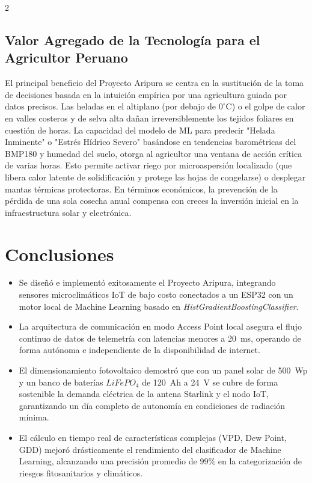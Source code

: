 \documentclass[a4paper, 11pt]{article}
\begin{document}
\begin{multicols}{2}
\subsection{Valor Agregado de la Tecnología para el Agricultor Peruano}
El principal beneficio del Proyecto Aripura se centra en la sustitución de la toma de decisiones basada en la intuición empírica por una agricultura guiada por datos precisos. Las heladas en el altiplano (por debajo de $0^\circ\text{C}$) o el golpe de calor en valles costeros y de selva alta dañan irreversiblemente los tejidos foliares en cuestión de horas. La capacidad del modelo de ML para predecir "Helada Inminente" o "Estrés Hídrico Severo" basándose en tendencias barométricas del BMP180 y humedad del suelo, otorga al agricultor una ventana de acción crítica de varias horas. Esto permite activar riego por microaspersión localizado (que libera calor latente de solidificación y protege las hojas de congelarse) o desplegar mantas térmicas protectoras. En términos económicos, la prevención de la pérdida de una sola cosecha anual compensa con creces la inversión inicial en la infraestructura solar y electrónica.

\section{Conclusiones}

\begin{itemize}
    \item Se diseñó e implementó exitosamente el Proyecto Aripura, integrando sensores microclimáticos IoT de bajo costo conectados a un ESP32 con un motor local de Machine Learning basado en \textit{HistGradientBoostingClassifier}.
    \item La arquitectura de comunicación en modo Access Point local asegura el flujo continuo de datos de telemetría con latencias menores a \SI{20}{ms}, operando de forma autónoma e independiente de la disponibilidad de internet.
    \item El dimensionamiento fotovoltaico demostró que con un panel solar de \SI{500}{Wp} y un banco de baterías $LiFePO_4$ de \SI{120}{Ah} a \SI{24}{V} se cubre de forma sostenible la demanda eléctrica de la antena Starlink y el nodo IoT, garantizando un día completo de autonomía en condiciones de radiación mínima.
    \item El cálculo en tiempo real de características complejas (VPD, Dew Point, GDD) mejoró drásticamente el rendimiento del clasificador de Machine Learning, alcanzando una precisión promedio de $99\%$ en la categorización de riesgos fitosanitarios y climáticos.
\end{itemize}


\end{multicols}
\end{document}
